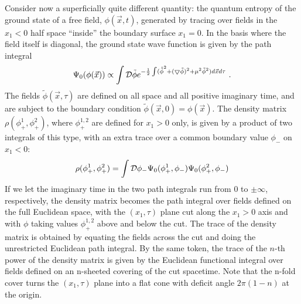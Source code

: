 \documentclass[12pt]{article}
\begin{document}
Consider now a superficially quite different quantity: the quantum
entropy of the ground state of a free field, $\phi(\vec x,t)$, generated
by tracing over fields in the $x_1<0$ half space ``inside'' the boundary
surface $x_1=0$. In the basis where the field itself is diagonal, the ground
state wave function is given by the path integral
\begin{equation}
\Psi_0 (\phi(\vec x)) \propto \int {\cal D} {\tilde \phi}
e^{-{1 \over 2}
\int ({\dot {\tilde \phi}}^2 +
(\bigtriangledown {\tilde \phi})^2 +\mu^2 {\tilde \phi}^2) d\vec xd\tau}~.
\label{wavefn}
\end{equation}
The fields $\tilde \phi (\vec x, \tau)$ are defined on all space and all
positive imaginary time, and are subject to the boundary condition
$\tilde \phi (\vec x, 0) = \phi (\vec x)$. The density matrix
$\rho(\phi_+^1 , \phi_+^2)$, where $\phi_+^{1,2}$ are defined for $x_1>0$ only,
is given by a product of two integrals of this type, with an extra trace over a
common boundary value $\phi_-$ on $x_1<0$:
\begin{equation}
\rho(\phi_+^1 , \phi_+^2) = \int{\cal D}\phi_-
\Psi_0(\phi_+^1,\phi_-) \Psi_0(\phi_+^2,\phi_-)
\label{gdstdm}
\end{equation}
If we let the imaginary time in the
two path
integrals run from $0$ to $\pm\infty$, respectively, the density matrix
becomes the path integral over fields defined on the full Euclidean space, with
the $(x_1,\tau)$ plane cut along the $x_1>0$ axis and with $\phi$ taking values
$\phi_+^{1,2}$ above and below the cut. The trace of the density matrix is
obtained by equating the fields across the cut and doing the unrestricted
Euclidean path integral. By the same token, the
trace of the $n$-th power of the density matrix is given by the Euclidean
functional integral over fields defined on an n-sheeted covering of the cut
spacetime. Note that the n-fold cover turns the $(x_1,\tau)$ plane into a flat
cone with deficit angle $2\pi(1-n)$ at the origin.
\end{document}
